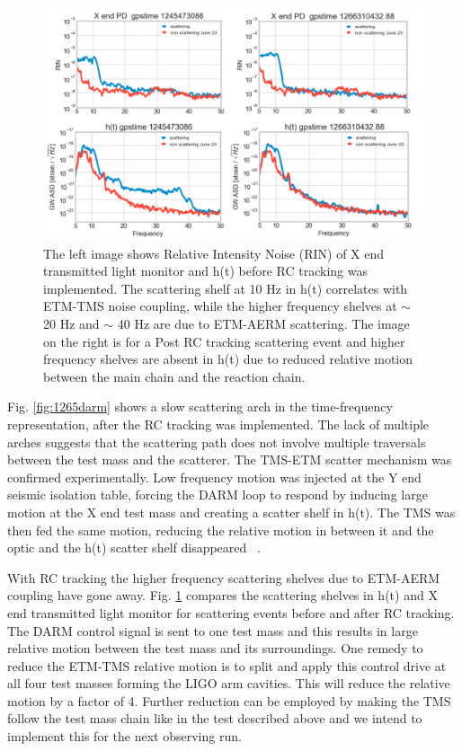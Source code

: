 \documentclass[12pt]{iopart}
\begin{document}
\begin{figure}[h]
    \centering
    \includegraphics[width=\textwidth]{etm-transmon.png}
    \caption{The left image shows Relative Intensity Noise (RIN) of  X end transmitted light monitor and h(t) before RC tracking was implemented. The scattering shelf at 10 Hz in h(t) correlates with ETM-TMS noise coupling, while the higher frequency shelves at $\sim$ 20 Hz and $\sim$ 40 Hz are due to ETM-AERM scattering. The image on the right is for a Post RC tracking scattering event and higher frequency shelves are absent in h(t) due to reduced relative motion between the main chain and the reaction chain.}
    \label{fig:etm-transmon}
\end{figure}

\par
Fig. \ref{fig:1265darm} shows a slow scattering arch in the time-frequency representation, after the RC tracking was implemented. The lack of multiple arches suggests that the scattering path does not involve multiple traversals between the test mass and the scatterer. The TMS-ETM scatter mechanism was confirmed experimentally. Low frequency motion was injected at the Y end seismic isolation table, forcing the DARM loop to respond by inducing large motion at the X end test mass and creating a scatter shelf in h(t). The TMS was then fed the same motion, reducing the relative motion in between it and the optic and the h(t) scatter shelf disappeared ~\cite{alogae_tmsx,alogsid_tmsx,Heijningen:2018evm}.

With RC tracking the higher frequency scattering shelves due to ETM-AERM coupling have gone away. Fig. \ref{fig:etm-transmon} compares the scattering shelves in h(t) and X end transmitted light monitor for scattering events before and after RC tracking. The DARM control signal is sent to one test mass and this results in large relative motion between the test mass and its surroundings. One remedy to reduce the ETM-TMS relative motion is to split and apply this control drive at all four test masses forming the LIGO arm cavities. This will reduce the relative motion by a factor of 4. Further reduction can be employed by making the TMS follow the test mass chain like in the test described above and we intend to implement this for the next observing run.
\end{document}
